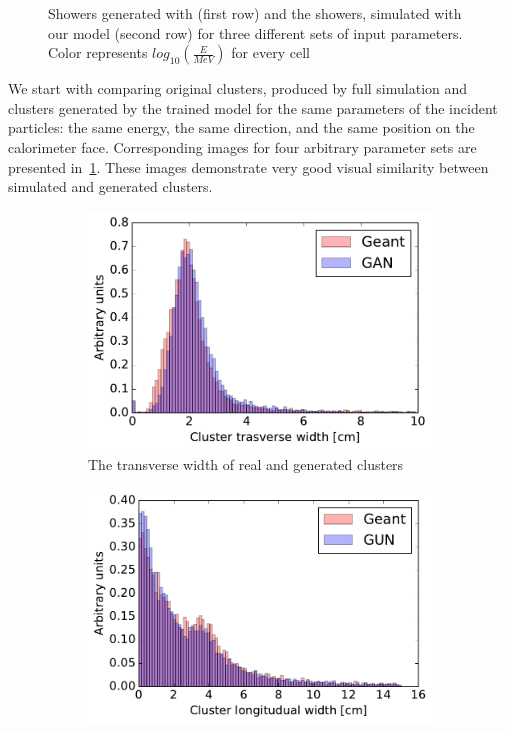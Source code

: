 \begin{figure}
  \caption{Showers generated with \geant (first row) and the showers,
    simulated with our model (second row) for three different sets of
    input parameters. Color represents $log_{10}(\frac{E}{MeV})$ for every cell}
  \label{fig:geant_vs_ours}
\end{figure}

We start with comparing original clusters, produced by full \geant
simulation and clusters generated by the trained model for the same
 parameters of the incident particles: the same energy, the same direction,
 and the same position on the calorimeter face. Corresponding images
 for four arbitrary parameter sets are presented
 in~\cref{fig:geant_vs_ours}. These images demonstrate very good
 visual similarity between simulated and generated clusters.


\begin{figure}
  \centering
  \begin{subfigure}[t]{0.3\textwidth}
    \centering
    \includegraphics[width=1\textwidth]{figures/width_trans.pdf}
    \caption{The transverse width of real and generated clusters}
  \end{subfigure}\hspace{0.2\textwidth}
 \begin{subfigure}[t]{0.3\textwidth}
    \centering
    \includegraphics[width=1\textwidth]{figures/width_long.pdf}

\end{subfigure}
\end{figure}

